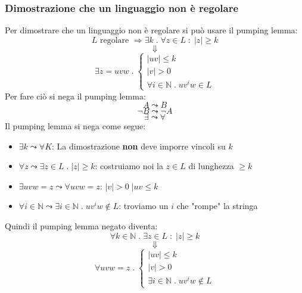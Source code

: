 \documentclass[a4paper]{article}
\begin{document}
\subsubsection{Dimostrazione che un linguaggio non è regolare}
Per dimostrare che un linguaggio non è regolare si può usare il pumping lemma:
\[
  L \text{ regolare } \Rightarrow \exists k \;.\; \forall z \in L \;:\; |z| \ge k
\] 
\[
  \Downarrow
\] 
\[
  \exists z = uvw \;.\; \begin{cases}
    |uv| \le k\\
    |v| > 0\\
    \forall i \in \mathbb{N} \;.\; uv^iw \in L
  \end{cases}
\]
Per fare ciò si nega il pumping lemma:
\[
  A \leadsto B
\] 
\[
  \neg B \leadsto \neg A
\] 
\[
  \exists \leadsto \forall 
\] 
Il pumping lemma si nega come segue:
\begin{itemize}
  \item \( \exists k \leadsto \forall K \):
    La dimostrazione \textbf{non} deve imporre vincoli su \( k \)

  \item \( \forall z \leadsto \exists z \in L \;.\; \left| z \right| \ge k \):
    costruiamo noi la \( z \in L \) di lunghezza \( \ge k \) 

  \item \( \exists uvw = z \leadsto \forall uvw = z \):
    \( |v| > 0 \; |uv \le k \) 
  \item \( \forall i \in \mathbb{N} \leadsto \exists i \in \mathbb{N} \;.\; uv^iw \notin L \):
    troviamo un \( i \) che "rompe" la stringa
\end{itemize}
Quindi il pumping lemma negato diventa:
\[
  \forall k \in \mathbb{N} \;.\; \exists z \in L \;:\; |z| \ge k
\] 
\[
  \Downarrow
\] 
\[
  \forall  uvw = z \;.\; \begin{cases}
    |uv| \le k\\
    |v| > 0\\
    \exists i \in \mathbb{N} \;.\; uv^iw \notin L
  \end{cases}
\] 
\label{27-10-D3}
\end{document}
